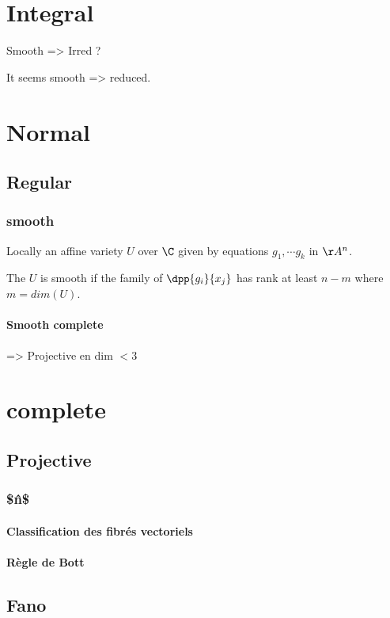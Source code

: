 \chapter{Integral}


Smooth => Irred ?

It seems smooth => reduced.

\chapter{Normal}

\section{Regular}

\subsection{smooth}
Locally an affine variety $U$ over $\C$ given by equations $g_1,\cdots g_k$ in $\AA^n$.

The $U$ is smooth if the family of $\dpp{g_i}{x_j}$ has rank at least $n-m$ where $m = dim(U)$.

\subsubsection{Smooth complete}


=> Projective en dim $<3$
                        
                        

\chapter{complete}

\section{Projective}

\subsection{\$\Pro\^n\$}

\subsubsection{Classification des fibrés vectoriels}

\subsubsection{Règle de Bott}

\section{Fano}
